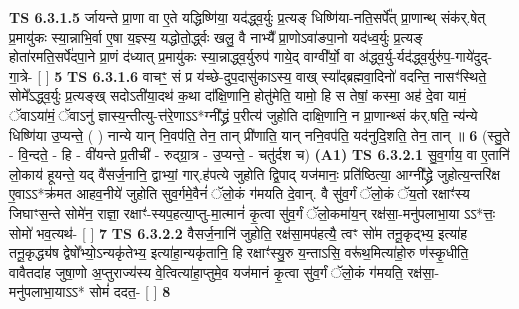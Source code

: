\documentclass[17pt]{extarticle}
\begin{document}
                  \newline
                                \textbf{ TS 6.3.1.5} \newline
                  र्जायन्ते प्रा॒णा वा ए॒ते यद्धिष्णि॑या॒ यद॑द्ध्व॒र्युः प्र॒त्यङ् धिष्णि॑या-नति॒सर्पे᳚त् प्रा॒णान्थ् संक॑र्.षेत् प्र॒मायु॑कः स्या॒न्नाभि॒र्वा ए॒षा य॒ज्ञ्स्य॒ यद्धोतो॒र्द्ध्वः खलु॒ वै नाभ्यै᳚ प्रा॒णोऽवा॑ङपा॒नो यद॑ध्व॒र्युः प्र॒त्यङ् होता॑रमति॒सर्पे॑दपा॒ने प्रा॒णं द॑ध्यात् प्र॒मायु॑कः स्या॒न्नाद्ध्व॒र्युरुप॑ गाये॒द् वाग्वी᳚र्यो॒ वा अ॑द्ध्व॒र्यु-र्यद॑द्ध्व॒र्युरु॑प॒-गाये॑दुद्-गा॒त्रे- [  ] \textbf{  5} \newline
                  \newline
                                \textbf{ TS 6.3.1.6} \newline
                  वाचꣳ॒॒ सं प्र य॑च्छे-दुप॒दासु॑काऽस्य॒ वाख् स्या᳚द्ब्रह्मवा॒दिनो॑ वदन्ति॒ नासꣳ॑स्थिते॒ सोमे᳚ऽद्ध्व॒र्युः प्र॒त्यङ्ख् सदोऽती॑या॒दथ॑ क॒था दा᳚क्षि॒णानि॒ होतु॑मेति॒ यामो॒ हि स तेषां॒ कस्मा॒ अह॑ दे॒वा यामं॒ ॅवाऽया॑मं॒ ॅवाऽनु॑ ज्ञास्य॒न्तीत्यु-त्त॑रे॒णाऽऽ*ग्नी᳚द्ध्रं प॒रीत्य॑ जुहोति दाक्षि॒णानि॒ न प्रा॒णान्थ्सं क॑र्.षति॒ न्य॑न्ये धिष्णि॑या उ॒प्यन्ते॒ ( ) नान्ये यान् नि॒वप॑ति॒ तेन॒ तान् प्री॑णाति॒ यान् ननि॒वप॑ति॒ यद॑नुदि॒शति॒ तेन॒ तान् ॥ \textbf{  6 } \newline
                  \newline
                      (स्तु॒ते - वि॒न्दते॒ - हि - वी॑यन्ते प्र॒तीची॑ - रुद्ग्रा॒त्र - उ॒प्यन्ते॒ - चतु॑र्दश च)  \textbf{(A1)} \newline \newline
                                        \textbf{ TS 6.3.2.1} \newline
                  सु॒व॒र्गाय॒ वा ए॒तानि॑ लो॒काय॑ हूयन्ते॒ यद् वै॑सर्ज॒नानि॒ द्वाभ्यां॒ गार्.ह॑पत्ये जुहोति द्वि॒पाद् यज॑मानः॒ प्रति॑ष्ठित्या॒ आग्नी᳚द्ध्रे जुहोत्य॒न्तरि॑क्ष ए॒वाऽऽ*क्र॑मत आहव॒नीये॑ जुहोति सुव॒र्गमे॒वैनं॑ ॅलो॒कं ग॑मयति दे॒वान्. वै सु॑व॒र्गं ॅलो॒कं ॅय॒तो रक्षाꣳ॑स्य जिघाꣳस॒न्ते सोमे॑न॒ राज्ञा॒ रक्षाꣳ॑-स्यप॒हत्या॒प्तु-मा॒त्मानं॑ कृ॒त्वा सु॑व॒र्गं ॅलो॒कमा॑य॒न् रक्ष॑सा॒-मनु॑पलाभा॒या ऽऽ*त्तः॒ सोमो॑ भव॒त्यथ॑- [  ] \textbf{  7} \newline
                  \newline
                                \textbf{ TS 6.3.2.2} \newline
                  वैसर्ज॒नानि॑ जुहोति॒ रक्ष॑सा॒मप॑हत्यै॒ त्वꣳ सो॑म तनू॒कृद्भ्य॒ इत्या॑ह तनू॒कृद्ध्य॑ष द्वेषो᳚भ्यो॒ऽन्यकृ॑तेभ्य॒ इत्या॑हा॒न्यकृ॑तानि॒ हि रक्षाꣳ॑स्यु॒रु य॒न्ताऽसि॒ वरू॑थ॒मित्या॑हो॒रु ण॑स्कृ॒धीति॒ वावैतदा॑ह जुषा॒णो अ॒प्तुराज्य॑स्य वे॒त्वित्या॑हा॒प्तुमे॒व यज॑मानं कृ॒त्वा सु॑व॒र्गं ॅलो॒कं ग॑मयति॒ रक्ष॑सा॒-मनु॑पलाभा॒याऽऽ* सोमं॑ ददत॒- [  ] \textbf{  8} \newline
\end{document}
